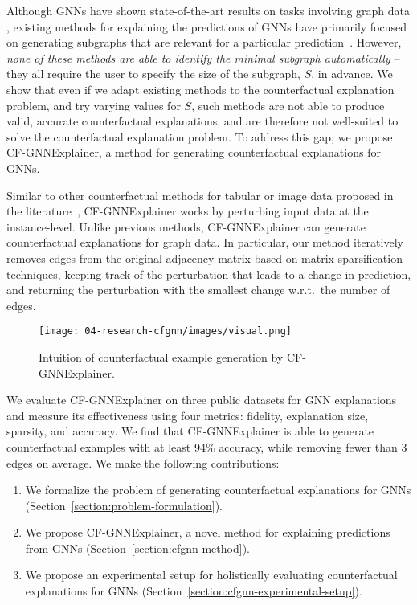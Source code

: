 Although GNNs have shown state-of-the-art results on tasks involving graph data \citep{zitnik_modeling_2018,deac_drug-drug_2019}, existing methods for explaining the predictions of GNNs have primarily focused on generating subgraphs that are relevant for a particular prediction~\citep{yuan2020explainability,baldassarre_explainability_2019,duval2021graphsvx,lin_causal_2021,luo_parameterized_2020,pope_explainability_2019,schlichtkrull_interpreting_2020,vu2020pgmexplainer,ying_gnnexplainer_2019,yuan_subgraph_2021}. 
However, \emph{none of these methods are able to identify the minimal subgraph automatically} -- they all require the user to specify the size of the subgraph, $S$, in advance. 
We show that even if we adapt existing methods to the counterfactual explanation problem, and try varying values for $S$, such methods are not able to produce valid, accurate counterfactual explanations, and are therefore not well-suited to solve the counterfactual explanation problem. 
To address this gap, we propose CF-GNNExplainer, a method for generating counterfactual explanations for GNNs. 

Similar to other counterfactual methods for tabular or image data proposed in the literature~\citep{verma2020counterfactual, karimi2020survey}, CF-GNNExplainer works by perturbing input data at the instance-level. 
Unlike previous methods, CF-GNNExplainer can generate counterfactual explanations for graph data. 
In particular, our method iteratively removes edges from the original adjacency matrix based on matrix sparsification techniques, keeping track of the perturbation that leads to a change in prediction, and returning the perturbation with the smallest change w.r.t.\ the number of edges. 

\begin{figure}[t]
    \centering
    \texttt{[image: 04-research-cfgnn/images/visual.png]}
    \caption{Intuition of counterfactual example generation by CF-GNNExplainer.}
    \label{fig:visual}
\end{figure}

\pagebreak

We evaluate CF-GNNExplainer on three public datasets for GNN explanations and measure its effectiveness using four metrics: fidelity, explanation size, sparsity, and accuracy. We find that CF-GNNExplainer is able to generate counterfactual examples with at least 94\% accuracy, while removing fewer than 3 edges on average. 
We make the following contributions:
\begin{enumerate}[(1)]
    \item We formalize the problem of generating counterfactual explanations for GNNs (Section~\ref{section:problem-formulation}). 
    \item We propose CF-GNNExplainer, a novel method for explaining predictions from GNNs (Section~\ref{section:cfgnn-method}). 
    \item We propose an experimental setup for holistically evaluating counterfactual explanations for GNNs (Section~\ref{section:cfgnn-experimental-setup}).
\end{enumerate}   



